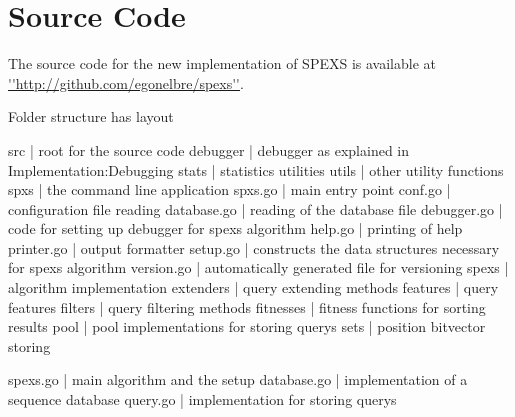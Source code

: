 \chapter{Source Code}
\label{add:files}

The source code for the new implementation of SPEXS is available at \url{''http://github.com/egonelbre/spexs''}.

Folder structure has layout

	src | root for the source code
		debugger | debugger as explained in Implementation:Debugging
		stats | statistics utilities
		utils | other utility functions
		spxs  | the command line application
			spxs.go | main entry point
			conf.go | configuration file reading
			database.go | reading of the database file
			debugger.go | code for setting up debugger for spexs algorithm
			help.go | printing of help
			printer.go | output formatter
			setup.go | constructs the data structures necessary for spexs algorithm
			version.go | automatically generated file for versioning
		spexs | algorithm implementation
			extenders | query extending methods
			features | query features
			filters  | query filtering methods
			fitnesses | fitness functions for sorting results
			pool | pool implementations for storing querys
			sets | position bitvector storing

			spexs.go | main algorithm and the setup
			database.go | implementation of a sequence database
			query.go | implementation for storing querys